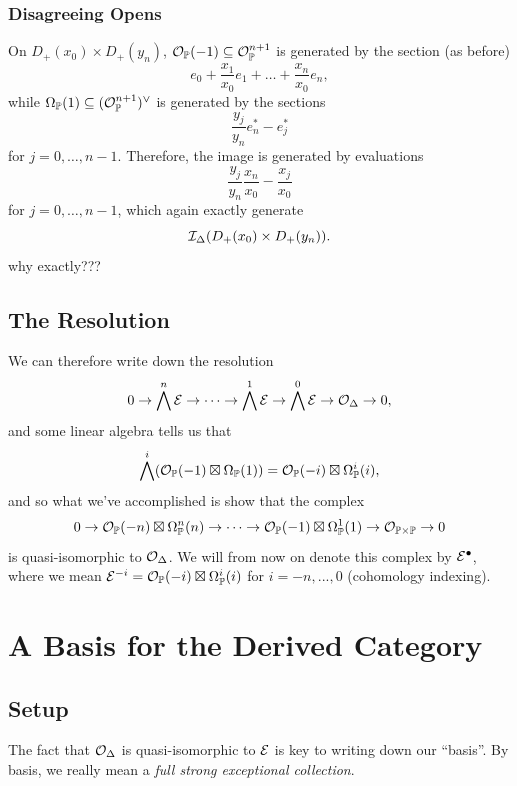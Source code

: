 \documentclass[12pt]{article}
\begin{document}
\subsubsection{Disagreeing Opens}

On $D_+(x_0)\times D_+(y_n)$, $\mathcal{O}_{\mathbb{P}}(-1)\subseteq \mathcal{O}_{\mathbb{P}}^{n+1}$ is generated by the section (as before)
\[e_0 + \frac{x_1}{x_0} e_1 + \dots + \frac{x_n}{x_0} e_n,\]
while $\Omega_{\mathbb{P}}(1)\subseteq (\mathcal{O}_{\mathbb{P}}^{n+1})^\vee$ is generated by the sections
\[\frac{y_j}{y_n} e_n^* - e_j^*\]
for $j=0,\dots,n-1$. Therefore, the image is generated by evaluations
\[\frac{y_j}{y_n}\frac{x_n}{x_0} - \frac{x_j}{x_0}\]
for $j=0,\dots,n-1$, which again exactly generate
\[\mathcal{I}_\Delta(D_+(x_0) \times D_+(y_n)).\]
{\color{red} why exactly???}


\subsection{The Resolution}

We can therefore write down the resolution
\[0\to \bigwedge^n \mathcal{E} \to \cdots \to \bigwedge^1 \mathcal{E} \to \bigwedge^0 \mathcal{E} \to \mathcal{O}_\Delta \to 0,\]
and some linear algebra tells us that
\[\bigwedge^i (\mathcal{O}_{\mathbb{P}}(-1) \boxtimes \Omega_{\mathbb{P}}(1)) = \mathcal{O}_{\mathbb{P}}(-i) \boxtimes \Omega_{\mathbb{P}}^i(i),\]
and so what we've accomplished is show that the complex
\[0 \to \mathcal{O}_{\mathbb{P}}(-n) \boxtimes \Omega_{\mathbb{P}}^n(n) \to \cdots \to \mathcal{O}_{\mathbb{P}}(-1) \boxtimes \Omega_{\mathbb{P}}^1(1) \to \mathcal{O}_{\mathbb{P}\times\mathbb{P}} \to 0\]
is quasi-isomorphic to $\mathcal{O}_\Delta$. We will from now on denote this complex by $\mathcal{E}^\bullet$, where we mean $\mathcal{E}^{-i} = \mathcal{O}_{\mathbb{P}}(-i) \boxtimes \Omega_{\mathbb{P}}^i(i)$ for $i=-n,...,0$ (cohomology indexing).



\newpage
\section{A Basis for the Derived Category}

\subsection{Setup}

The fact that $\mathcal{O}_\Delta$ is quasi-isomorphic to $\mathcal{E}$ is key to writing down our ``basis''. By basis, we really mean a \textit{full strong exceptional collection}.
\end{document}
